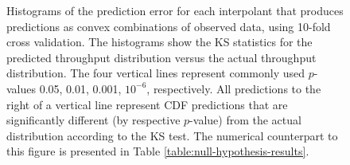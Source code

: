 \documentclass[smallextended,final]{svjour3}       %
\begin{document}


\begin{figure}
  \centering
  \caption{Histograms of the prediction error for each interpolant that
  produces predictions as convex combinations of observed data, using
  10-fold cross validation.  The histograms show the KS statistics for the
  predicted throughput distribution versus the actual throughput
  distribution. The four vertical lines represent commonly used $p$-values
  0.05, 0.01, 0.001, $10^{-6}$, respectively. All predictions to the right
  of a vertical line represent CDF predictions that are significantly
  different (by respective $p$-value) from the actual distribution according
  to the KS test. The numerical counterpart to this figure is presented
  in Table \ref{table:null-hypothesis-results}.}

 \label{fig:throughput-prediction}
\end{figure}
\end{document}
